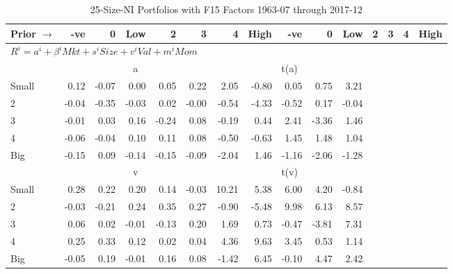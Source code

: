 
\begin{table}[!ht]
\footnotesize
\centering
\caption{25-Size-NI Portfolios with F15 Factors 1963-07 through 2017-12}
\begin{tabular}{lrrrrrrrrrrrrrr}
  \toprule
    Prior $\rightarrow$ & -ve & 0 & Low & 2 & 3 & 4 & High & -ve & 0 & Low & 2 & 3 & 4 & High \\ 
  \midrule
  \multicolumn{11}{l}{$R^i=a^i+\beta^iMkt+s^iSize+v^iVal+m^iMom$} \\

  
    
      & \multicolumn{5}{c}{a} & \multicolumn{5}{c}{t(a)}
    
    \\
      \cmidrule(r){2-6} \cmidrule(r){7-11}

    Small   & 0.12  & -0.07  & 0.00  & 0.05  & 0.22  & 2.05  & -0.80  & 0.05  & 0.75  & 3.21  \\
         2  & -0.04  & -0.35  & -0.03  & 0.02  & -0.00  & -0.54  & -4.33  & -0.52  & 0.17  & -0.04  \\
         3  & -0.01  & 0.03  & 0.16  & -0.24  & 0.08  & -0.19  & 0.44  & 2.41  & -3.36  & 1.46  \\
         4  & -0.06  & -0.04  & 0.10  & 0.11  & 0.08  & -0.50  & -0.63  & 1.45  & 1.48  & 1.04  \\
    Big     & -0.15  & 0.09  & -0.14  & -0.15  & -0.09  & -2.04  & 1.46  & -1.16  & -2.06  & -1.28  \\

  
    
      & \multicolumn{5}{c}{v} & \multicolumn{5}{c}{t(v)}
    
    \\
      \cmidrule(r){2-6} \cmidrule(r){7-11}

    Small   & 0.28  & 0.22  & 0.20  & 0.14  & -0.03  & 10.21  & 5.38  & 6.00  & 4.20  & -0.84  \\
         2  & -0.03  & -0.21  & 0.24  & 0.35  & 0.27  & -0.90  & -5.48  & 9.98  & 6.13  & 8.57  \\
         3  & 0.06  & 0.02  & -0.01  & -0.13  & 0.20  & 1.69  & 0.73  & -0.47  & -3.81  & 7.31  \\
         4  & 0.25  & 0.33  & 0.12  & 0.02  & 0.04  & 4.36  & 9.63  & 3.45  & 0.53  & 1.14  \\
    Big     & -0.05  & 0.19  & -0.01  & 0.16  & 0.08  & -1.42  & 6.45  & -0.10  & 4.47  & 2.42  \\

  
    

\end{tabular}
\end{table}

